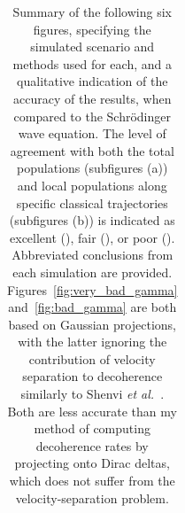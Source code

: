 {\begin{landscape}
\begin{table}
\begin{tabular}{cccccccp{8cm}}
    \end{tabular}
    \caption{
    Summary of the following six figures, specifying the simulated scenario and methods used for each, and a qualitative indication of the accuracy of the results, when compared to the Schr\"odinger wave equation. The level of agreement with both the total populations (subfigures (a)) and local populations along specific classical trajectories (subfigures (b)) is indicated as excellent (\cmark\cmark), fair (\cmark), or poor (\xmark). Abbreviated conclusions from each simulation are provided. Figures~\ref{fig:very_bad_gamma} and~\ref{fig:bad_gamma} are both based on Gaussian projections, with the latter ignoring the contribution of velocity separation to decoherence similarly to Shenvi \emph{et al.}~\cite{doi:10.1063/1.3575588}. Both are less accurate than my method of computing decoherence rates by projecting onto Dirac deltas, which does not suffer from the velocity-separation problem.
    }\label{table:figure_summary}
\end{table}
\end{landscape}
\restoregeometry
}

